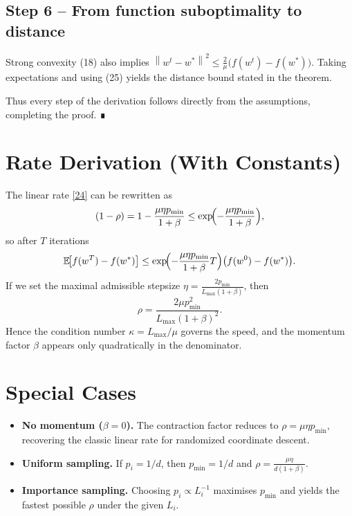 \documentclass{article}
\newcommand{\E}{\mathbb{E}}
\newcommand{\norm}[1]{\left\|#1\right\|}
\begin{document}
\subsection*{Step 6 – From function suboptimality to distance}
Strong convexity (18) also implies $\norm{w^{t}-w^{*}}^{2}\le \frac{2}{\mu}\bigl(f(w^{t})-f(w^{*})\bigr)$. Taking expectations and using (25) yields the distance bound stated in the theorem.

Thus every step of the derivation follows directly from the assumptions, completing the proof. ∎

\section*{Rate Derivation (With Constants)}
The linear rate \eqref{24} can be rewritten as
\[
(1-\rho) = 1-\frac{\mu\eta p_{\min}}{1+\beta}
        \le \exp\!\Bigl(-\frac{\mu\eta p_{\min}}{1+\beta}\Bigr),
\]
so after $T$ iterations
\[
\E\!\bigl[f(w^{T})-f(w^{*})\bigr]\le 
\exp\!\Bigl(-\frac{\mu\eta p_{\min}}{1+\beta}T\Bigr)
\bigl(f(w^{0})-f(w^{*})\bigr).
\]
If we set the maximal admissible stepsize $\eta = \frac{2p_{\min}}{L_{\max}(1+\beta)}$, then
\[
\rho = \frac{2\mu p_{\min}^{2}}{L_{\max}(1+\beta)^{2}} .
\]
Hence the condition number $\kappa = L_{\max}/\mu$ governs the speed, and the momentum factor $\beta$ appears only quadratically in the denominator.

\section*{Special Cases}
\begin{itemize}
    \item \textbf{No momentum ($\beta=0$).} The contraction factor reduces to $\rho=\mu\eta p_{\min}$, recovering the classic linear rate for randomized coordinate descent.
    \item \textbf{Uniform sampling.} If $p_i=1/d$, then $p_{\min}=1/d$ and $\rho = \frac{\mu\eta}{d(1+\beta)}$.
    \item \textbf{Importance sampling.} Choosing $p_i\propto L_i^{-1}$ maximises $p_{\min}$ and yields the fastest possible $\rho$ under the given $L_i$.
\end{itemize}
\end{document}
